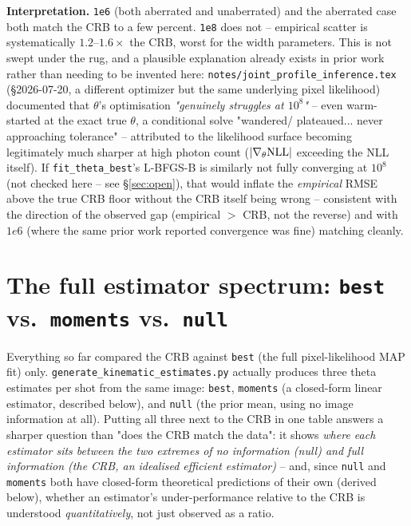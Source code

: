 \documentclass[11pt,a4paper]{article}
\newcommand{\code}[1]{\texttt{#1}}
\begin{document}
\textbf{Interpretation.} \code{1e6} (both aberrated and unaberrated) and the
aberrated case both match the CRB to a few percent. \code{1e8} does not --
empirical scatter is systematically $1.2$--$1.6\times$ the CRB, worst for
the width parameters. This is not swept under the rug, and a plausible
explanation already exists in prior work rather than needing to be invented
here: \code{notes/joint\_profile\_inference.tex} (\S2026-07-20, a different
optimizer but the same underlying pixel likelihood) documented that
$\theta$'s optimisation \emph{"genuinely struggles at $10^8$"} -- even
warm-started at the exact true $\theta$, a conditional solve "wandered/
plateaued... never approaching tolerance" -- attributed to the likelihood
surface becoming legitimately much sharper at high photon count
($|\nabla_\theta{\rm NLL}|$ exceeding the NLL itself). If
\code{fit\_theta\_best}'s L-BFGS-B is similarly not fully converging at
$10^8$ (not checked here -- see \S\ref{sec:open}), that would inflate the
\emph{empirical} RMSE above the true CRB floor without the CRB itself being
wrong -- consistent with the direction of the observed gap (empirical $>$
CRB, not the reverse) and with $1e6$ (where the same prior work reported
convergence was fine) matching cleanly.

\section{The full estimator spectrum: \code{best} vs.\ \code{moments} vs.\ \code{null}}
\label{sec:spectrum}

Everything so far compared the CRB against \code{best} (the full
pixel-likelihood MAP fit) only. \code{generate\_kinematic\_estimates.py}
actually produces three theta estimates per shot from the same image:
\code{best}, \code{moments} (a closed-form linear estimator, described
below), and \code{null} (the prior mean, using no image information at
all). Putting all three next to the CRB in one table answers a sharper
question than "does the CRB match the data": it shows \emph{where each
estimator sits between the two extremes of no information (null) and full
information (the CRB, an idealised efficient estimator)} -- and, since
\code{null} and \code{moments} both have closed-form theoretical
predictions of their own (derived below), whether an estimator's
under-performance relative to the CRB is understood \emph{quantitatively},
not just observed as a ratio.
\end{document}
